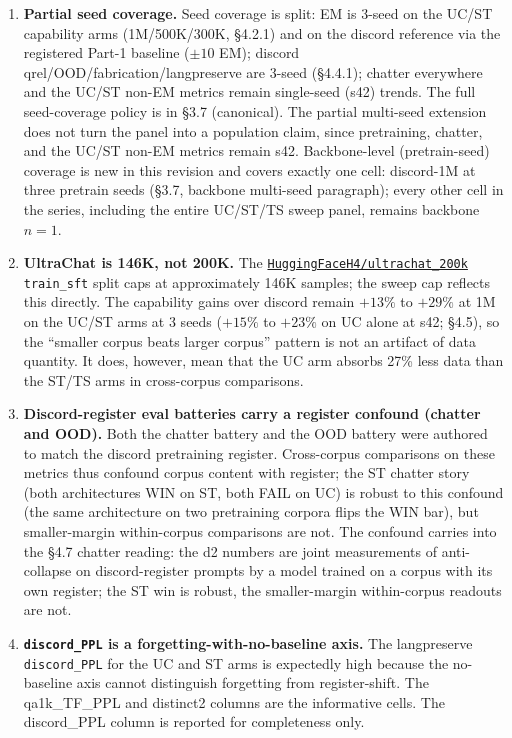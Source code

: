 \documentclass[11pt]{article}
\begin{document}
\begin{enumerate}
  \item \textbf{Partial seed coverage.} Seed coverage is split: EM is 3-seed on the UC/ST capability arms (1M/500K/300K, \S4.2.1) and on the discord reference via the registered Part-1 baseline ($\pm 10$ EM); discord qrel/OOD/fabrication/langpreserve are 3-seed (\S4.4.1); chatter everywhere and the UC/ST non-EM metrics remain single-seed (s42) trends. The full seed-coverage policy is in \S3.7 (canonical). The partial multi-seed extension does not turn the panel into a population claim, since pretraining, chatter, and the UC/ST non-EM metrics remain s42. Backbone-level (pretrain-seed) coverage is new in this revision and covers exactly one cell: discord-1M at three pretrain seeds (\S3.7, backbone multi-seed paragraph); every other cell in the series, including the entire UC/ST/TS sweep panel, remains backbone $n = 1$.

  \item \textbf{UltraChat is 146K, not 200K.} The \href{https://huggingface.co/datasets/HuggingFaceH4/ultrachat_200k}{\texttt{HuggingFaceH4/ultrachat\_200k}} \texttt{train\_sft} split caps at approximately 146K samples; the sweep cap reflects this directly. The capability gains over discord remain $+13\%$ to $+29\%$ at 1M on the UC/ST arms at 3 seeds ($+15\%$ to $+23\%$ on UC alone at s42; \S4.5), so the ``smaller corpus beats larger corpus'' pattern is not an artifact of data quantity. It does, however, mean that the UC arm absorbs 27\% less data than the ST/TS arms in cross-corpus comparisons.

  \item \textbf{Discord-register eval batteries carry a register confound (chatter and OOD).} Both the chatter battery and the OOD battery were authored to match the discord pretraining register. Cross-corpus comparisons on these metrics thus confound corpus content with register; the ST chatter story (both architectures WIN on ST, both FAIL on UC) is robust to this confound (the same architecture on two pretraining corpora flips the WIN bar), but smaller-margin within-corpus comparisons are not. The confound carries into the \S4.7 chatter reading: the d2 numbers are joint measurements of anti-collapse on discord-register prompts by a model trained on a corpus with its own register; the ST win is robust, the smaller-margin within-corpus readouts are not.

  \item \textbf{\texttt{discord\_PPL} is a forgetting-with-no-baseline axis.} The langpreserve \texttt{discord\_PPL} for the UC and ST arms is expectedly high because the no-baseline axis cannot distinguish forgetting from register-shift. The qa1k\_TF\_PPL and distinct2 columns are the informative cells. The discord\_PPL column is reported for completeness only.


\end{enumerate}
\end{document}
